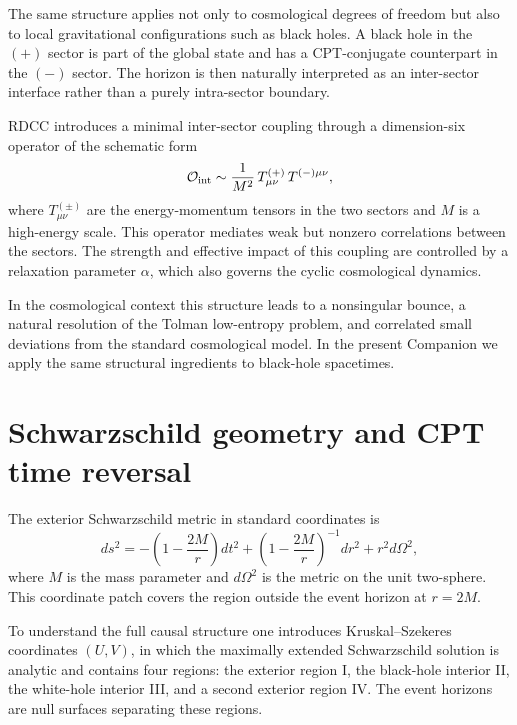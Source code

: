 \documentclass[11pt,a4paper]{article}
\begin{document}
The same structure applies not only to cosmological degrees of freedom but also to local gravitational configurations such as black holes. A black hole in the \((+)\) sector is part of the global state and has a CPT-conjugate counterpart in the \((-)\) sector. The horizon is then naturally interpreted as an inter-sector interface rather than a purely intra-sector boundary.

RDCC introduces a minimal inter-sector coupling through a dimension-six operator of the schematic form
\begin{equation}
\mathcal{O}_{\rm int} \sim \frac{1}{M^{2}} \, T^{(+)}_{\mu\nu} \, T^{(-)\mu\nu},
\end{equation}
where \(T^{(\pm)}_{\mu\nu}\) are the energy-momentum tensors in the two sectors and \(M\) is a high-energy scale. This operator mediates weak but nonzero correlations between the sectors. The strength and effective impact of this coupling are controlled by a relaxation parameter \(\alpha\), which also governs the cyclic cosmological dynamics.

In the cosmological context this structure leads to a nonsingular bounce, a natural resolution of the Tolman low-entropy problem, and correlated small deviations from the standard cosmological model. In the present Companion we apply the same structural ingredients to black-hole spacetimes.


\section{Schwarzschild geometry and CPT time reversal}

The exterior Schwarzschild metric in standard coordinates is
\begin{equation}
ds^{2} = -\left(1 - \frac{2M}{r}\right) dt^{2} 
+ \left(1 - \frac{2M}{r}\right)^{-1} dr^{2} 
+ r^{2} d\Omega^{2},
\end{equation}
where \(M\) is the mass parameter and \(d\Omega^{2}\) is the metric on the unit two-sphere. 
This coordinate patch covers the region outside the event horizon at \(r = 2M\).

To understand the full causal structure one introduces Kruskal–Szekeres coordinates \((U,V)\), 
in which the maximally extended Schwarzschild solution is analytic and contains four regions:
the exterior region I, the black-hole interior II, the white-hole interior III, and a second exterior region IV. 
The event horizons are null surfaces separating these regions.
\end{document}
